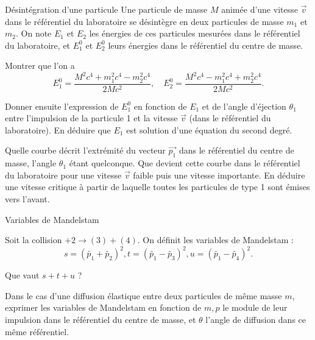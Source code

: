 \begin{exo}[PC][1][colle]{Désintégration d'une particule}
Une particule de masse $M$ animée d'une vitesse $\vec{v}$ dans le référentiel du laboratoire se désintègre en deux particules de masse $m_1$ et $m_2$. On note $E_1$ et $E_2$ les énergies de ces particules mesurées dans le référentiel du laboratoire, et $E_1^0$ et $E_2^0$ leurs énergies dans le référentiel du centre de masse.
\begin{quest}
  \item Montrer que l'on a
  $$
  E_1^0=\frac{M^2 c^4+m_1^2 c^4-m_2^2 c^4}{2 M c^2}, \quad E_2^0=\frac{M^2 c^4-m_1^2 c^4+m_2^2 c^4}{2 M c^2} .
  $$
  \item Donner ensuite l'expression de $E_1^0$ en fonction de $E_1$ et de l'angle d'éjection $\theta_1$ entre l'impulsion de la particule 1 et la vitesse $\vec{v}$ (dans le référentiel du laboratoire). En déduire que $E_1$ est solution d'une équation du second degré.
  \item Quelle courbe décrit l'extrémité du vecteur $\overrightarrow{p_1}$ dans le référentiel du centre de masse, l'angle $\theta_1$ étant quelconque. Que devient cette courbe dans le référentiel du laboratoire pour une vitesse $\vec{v}$ faible puis une vitesse importante. En déduire une vitesse critique à partir de laquelle toutes les particules de type 1 sont émises vers l'avant.
\end{quest}
\end{exo}

\begin{exo}[PC][1][colle]{Variables de Mandelstam}
  \begin{quest}
    \item Soit la collision $+2 \rightarrow(3)+(4)$. On définit les variables de Mandelstam :
    $$
    s=\left(\tilde{p_1}+\tilde{p_2}\right)^2, t=\left(\tilde{p_1}-\tilde{p_3}\right)^2, u=\left(\tilde{p_1}-\tilde{p_4}\right)^2 .
    $$
    
    Que vaut $s+t+u$ ?
    \item Dans le cas d'une diffusion élastique entre deux particules de même masse $m$, exprimer les variables de Mandelstam en fonction de $m, p$ le module de leur impulsion dans le référentiel du centre de masse, et $\theta$ l'angle de diffusion dans ce même référentiel.
  \end{quest}
  \end{exo}

